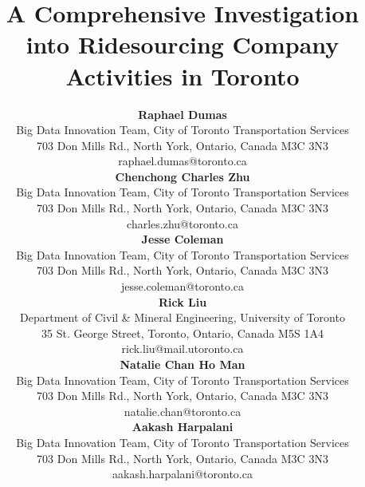 \title{A Comprehensive Investigation into Ridesourcing Company
Activities in Toronto}

\author{%
  \textbf{Raphael Dumas}\\
  Big Data Innovation Team, City of Toronto Transportation Services\\
  703 Don Mills Rd., North York, Ontario, Canada M3C 3N3\\
  raphael.dumas@toronto.ca\\
  \hfill\break%
  \textbf{Chenchong Charles Zhu}\\
  Big Data Innovation Team, City of Toronto Transportation Services\\
  703 Don Mills Rd., North York, Ontario, Canada M3C 3N3\\
  charles.zhu@toronto.ca\\
  \hfill\break%
  \textbf{Jesse Coleman}\\
  Big Data Innovation Team, City of Toronto Transportation Services\\
  703 Don Mills Rd., North York, Ontario, Canada M3C 3N3\\
  jesse.coleman@toronto.ca\\
  \hfill\break%
  \textbf{Rick Liu}\\
  Department of Civil \& Mineral Engineering, University of Toronto\\
  35 St. George Street, Toronto, Ontario, Canada M5S 1A4\\
  rick.liu@mail.utoronto.ca\\
  \hfill\break%
  \textbf{Natalie Chan Ho Man}\\
  Big Data Innovation Team, City of Toronto Transportation Services\\
  703 Don Mills Rd., North York, Ontario, Canada M3C 3N3\\
  natalie.chan@toronto.ca\\
  \hfill\break%
  \textbf{Aakash Harpalani}\\
  Big Data Innovation Team, City of Toronto Transportation Services\\
  703 Don Mills Rd., North York, Ontario, Canada M3C 3N3\\
  aakash.harpalani@toronto.ca
}
